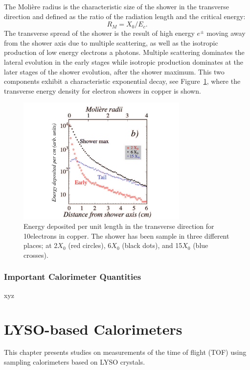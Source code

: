 The Moli\`ere radius is the characteristic size of the shower in the transverse
direction and defined as the ratio
of the radiation length and the critical energy:
\begin{equation}
R_{M} = X_{0}/E_{c}.
\end{equation} 
The transverse spread of the shower is the result of high
energy $e^{\pm}$ moving away from the shower axis due to multiple scattering, as well as the
isotropic production of low energy electrons a photons. Multiple
scattering dominates the lateral evolution in the early stages while
isotropic production dominates at the later stages of the shower
evolution, after the shower maximum. This two components exhibit a
characteristic exponential decay, see
Figure~\ref{fig:transverseProfile}, where the transverse energy density for
electron showers in copper is shown.
\begin{figure}[h] \centering
\includegraphics[width=0.75\textwidth]{calorimetry/ShowerProfile_Right.pdf}
\caption{Energy deposited per unit length in the transverse direction for
10\GeV electrons in copper. The shower has been sample in three
different places; at 2$X_{0}$ (red circles), 6$X_{0}$ (black dots),
and 15$X_{0}$ (blue crosses).}
\label{fig:transverseProfile}
\end{figure}
\clearpage
\subsection{Important Calorimeter Quantities}
 xyz

\chapter{LYSO-based Calorimeters}\label{lyso-cal}
This chapter presents studies on measurements of the time of flight (TOF) using sampling calorimeters 
based on LYSO crystals. 

